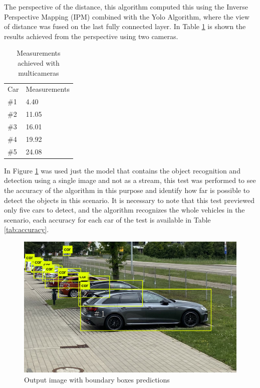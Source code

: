 The perspective of the distance, this algorithm computed this using the Inverse Perspective Mapping (IPM) combined with the Yolo Algorithm, where the view of distance was fused on the last fully connected layer. In Table \ref{tab:output_framework} is shown the results achieved from the perspective using two cameras. 

\begin{table}[H]
\centering
\caption{Measurements achieved with multicameras}
\begin{tabular}{l|l} 
\toprule
Car &  Measurements      \\
\#1   & 4.40        \\
\#2   & 11.05       \\
\#3   & 16.01       \\
\#4   & 19.92       \\
\#5   & 24.08       \\
\bottomrule
\end{tabular}
\label{tab:output_framework}
\end{table} 
 

In Figure \ref{fig:park_predict} was used just the model that contains the object recognition and detection using a single image and not as a stream, this test was performed to see the accuracy of the algorithm in this purpose and identify how far is possible to detect the objects in this scenario. It is necessary to note that this test previewed only five cars to detect, and the algorithm recognizes the whole vehicles in the scenario, each accuracy for each car of the test is available in Table \ref{tab:accuracy}.


\begin{figure}[H]
\centering
\includegraphics[scale=0.3]{imagens/predictions.jpg}
\caption{Output image with boundary boxes predictions}
\label{fig:park_predict}
\end{figure}



